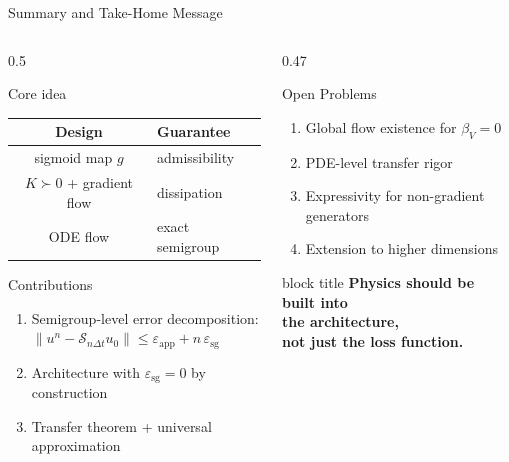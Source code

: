 \documentclass[aspectratio=169, 11pt]{beamer}
\newcommand{\cS}{\mathcal{S}}
\begin{document}
\begin{frame}{Summary and Take-Home Message}

\begin{columns}[T]
\begin{column}{0.5\textwidth}
\begin{block}{Core idea}
\centering
\small
\renewcommand{\arraystretch}{1.15}
\begin{tabular}{cl}
\toprule
\textbf{Design} & \textbf{Guarantee} \\
\midrule
sigmoid map $g$ & admissibility \\
$K\succ 0$ + gradient flow & dissipation \\
ODE flow & exact semigroup \\
\bottomrule
\end{tabular}
\end{block}

\vspace{0.15cm}
\begin{block}{Contributions}
\begin{enumerate}
    \item Semigroup-level error decomposition:\\
    $\|u^n - \cS_{n\Delta t}u_0\| \leq \varepsilon_{\mathrm{app}} + n\,\varepsilon_{\mathrm{sg}}$
    \item Architecture with $\varepsilon_{\mathrm{sg}}=0$ by construction
    \item Transfer theorem + universal approximation
\end{enumerate}
\end{block}
\end{column}

\begin{column}{0.47\textwidth}
\begin{alertblock}{Open Problems}
\begin{enumerate}
    \item Global flow existence for $\beta_V = 0$
    \item PDE-level transfer rigor
    \item Expressivity for non-gradient generators
    \item Extension to higher dimensions
\end{enumerate}
\end{alertblock}

\vspace{0.2cm}
\begin{beamercolorbox}[wd=\linewidth,rounded=true,shadow=true,sep=0.5em]{block title}
\centering
\large\textbf{Physics should be built into}\\[3pt]
\large\textbf{the architecture,}\\[3pt]
\large\textbf{not just the loss function.}
\end{beamercolorbox}


\end{column}
\end{columns}
\end{frame}
\end{document}
